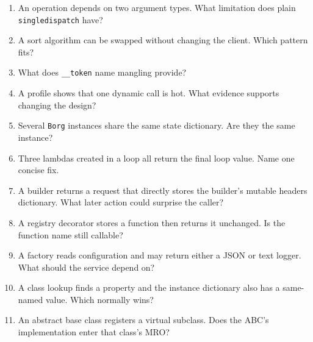 \documentclass[11pt]{article}
\begin{document}
\begin{keepsection}
\begin{enumerate}
\item An operation depends on two argument types. What limitation does plain \texttt{singledispatch} have?
\item A sort algorithm can be swapped without changing the client. Which pattern fits?
\item What does \texttt{\_\_token} name mangling provide?
\item A profile shows that one dynamic call is hot. What evidence supports changing the design?
\item Several \texttt{Borg} instances share the same state dictionary. Are they the same instance?
\item Three lambdas created in a loop all return the final loop value. Name one concise fix.
\item A builder returns a request that directly stores the builder’s mutable headers dictionary. What later action could surprise the caller?
\item A registry decorator stores a function then returns it unchanged. Is the function name still callable?
\item A factory reads configuration and may return either a JSON or text logger. What should the service depend on?
\item A class lookup finds a property and the instance dictionary also has a same-named value. Which normally wins?
\item An abstract base class registers a virtual subclass. Does the ABC’s implementation enter that class’s MRO?
\end{enumerate}

\end{keepsection}
\end{document}
